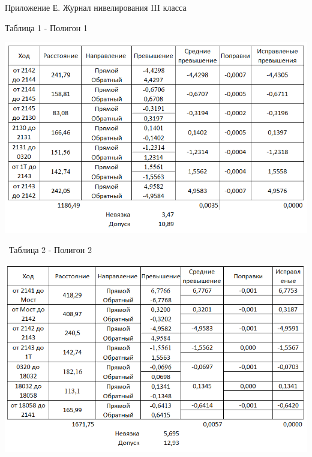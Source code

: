 \documentclass[a4paper]{article}
\begin{document}
\begin{newpage}

        \begin{flushright}
            Приложение Е. Журнал нивелирования III класса
        \end{flushright}
        
        \begin{center}
            \begin{flushleft}
                \: Таблица 1 - Полигон 1
            \end{flushleft}
            \includegraphics[scale=1.1]{N1.png}
            
            \begin{flushleft}
                \, Таблица 2 - Полигон 2
            \end{flushleft}
            \includegraphics[scale=1.1]{N2.png}
        \end{center}

\end{newpage}
\end{document}
